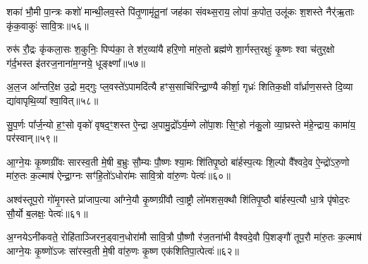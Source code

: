 {\anuvakamend[{}]}

शका॑ भौ॒मी पा॒न्त्रः कशो॑ मान्थी॒लव॒स्ते पि॑तृ॒णामृ॑तू॒नां जह॑का संवथ्स॒राय॒ लोपा॑ क॒पोत॒ उलू॑कः श॒शस्ते नैर्\mbox{}॑ऋ॒ताः कृ॑क॒वाकुः॑ सावि॒त्रः॥५६॥

{\anuvakamend[{बला॑य पुरुषमृ॒गः सौ॒री पृ॑ष॒तः शका॒ष्टाद॑शा॒ष्टाद॑श॥14-18॥}]}

रुरू॑ रौ॒द्रः कृ॑कला॒सः श॒कुनिः॒ पिप्प॑का॒ ते श॑र॒व्या॑यै हरि॒णो मा॑रु॒तो ब्रह्म॑णे शा॒र्गस्त॒रक्षुः॑ कृ॒ष्णः श्वा च॑तुर॒क्षो ग॑र्द॒भस्त इ॑तरज॒नाना॑म॒ग्नये॒ धूङ्क्ष्णा᳚॥५७॥

{\anuvakamend[{रुरु॑र्विꣳश॒तिः॥19॥}]}

अ॒ल॒ज आ᳚न्तरि॒क्ष उ॒द्रो म॒द्गुः प्ल॒वस्ते॑\-ऽपामदि॑त्यै हꣳस॒साचि॑रिन्द्रा॒ण्यै कीर्\mbox{}शा॒ गृध्रः॑ शितिक॒क्षी वा᳚र्ध्राण॒सस्ते दि॒व्या द्या॑वापृथि॒व्या᳚ श्वा॒वित्॥५८॥

{\anuvakamend[{}]}

सु॒प॒र्णः पा᳚र्ज॒न्यो ह॒ꣳ॒सो वृको॑ वृषद॒ꣳ॒शस्त ऐ॒न्द्रा अ॒पामु॒द्रो᳚\-ऽर्य॒म्णे लो॑पा॒शः सि॒ꣳ॒हो न॑कु॒लो व्या॒घ्रस्ते म॑हे॒न्द्राय॒ कामा॑य॒ पर॑स्वान्॥५९॥

{\anuvakamend[{अ॒ल॒जः सु॑प॒र्णो᳚\-ऽष्टाद॑शाष्टा॒द॑श॥21॥}]}

आ॒ग्ने॒यः कृ॒ष्णग्री॑वः सारस्व॒ती मे॒षी ब॒भ्रुः सौ॒म्यः पौ॒ष्णः श्या॒मः शि॑तिपृ॒ष्ठो बा॑र्\mbox{}हस्प॒त्यः शि॒ल्पो वै᳚श्वदे॒व ऐ॒न्द्रो॑\-ऽरु॒णो मा॑रु॒तः क॒ल्माष॑ ऐन्द्रा॒ग्नः सꣳ॑हि॒तो॑\-ऽधोरा॑मः सावि॒त्रो वा॑रु॒णः पेत्वः॑॥६०॥

{\anuvakamend[{आ॒ग्ने॒यो द्वाविꣳ॑शतिः॥22॥}]}

अश्व॑स्तूप॒रो गो॑मृ॒गस्ते प्रा॑जाप॒त्या आ᳚ग्ने॒यौ कृ॒ष्णग्री॑वौ त्वा॒ष्ट्रौ लो॑मशस॒क्थौ शि॑तिपृ॒ष्ठौ बा॑र्\mbox{}हस्प॒त्यौ धा॒त्रे पृ॑षोद॒रः सौ॒र्यो ब॒लक्षः॒ पेत्वः॑॥६१॥

{\anuvakamend[{अश्व॒ष्षोड॑श॥23॥}]}

अ॒ग्नये\-ऽनी॑कवते॒ रोहि॑ताञ्जिरन॒ड्वान॒धोरा॑मौ सावि॒त्रौ पौ॒ष्णौ र॑ज॒तना॑भी वैश्वदे॒वौ पि॒शङ्गौ॑ तूप॒रौ मा॑रु॒तः क॒ल्माष॑ आग्ने॒यः कृ॒ष्णो॑\-ऽजः सा॑रस्व॒ती मे॒षी वा॑रु॒णः कृ॒ष्ण एक॑शितिपा॒त्पेत्वः॑॥६२॥


{\anuvakamend[{अ॒ग्नयो\-ऽनी॑कवते॒ द्वाविꣳ॑शतिः॥24॥}]}

{}

